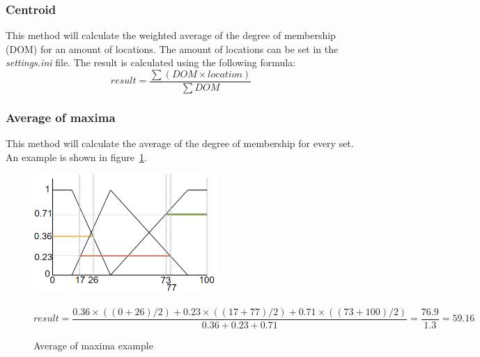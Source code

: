 \documentclass[10pt]{extarticle} %
\begin{document}
   \subsubsection {Centroid}  
   This method will calculate the weighted average of the degree of membership (DOM) for an amount of locations. The amount of locations can be set in the \emph{settings.ini} file.
   The result is calculated using the following formula:
   \[ result = \frac{\sum (DOM \times location)}{\sum DOM} \]
   
   \subsubsection {Average of maxima}  
   This method will calculate the average of the degree of membership for every set. An example is shown in figure~\ref{fig:maxAv}.
   \begin{figure}[h!]
   \begin{center}
   \includegraphics[width=7cm]{maxAv.png}
   \end{center}
   \[ result = \frac{0.36 \times ((0 + 26) / 2) + 0.23 \times ((17 + 77) / 2) + 0.71 \times ((73 + 100) / 2)}{0.36 + 0.23 + 0.71} = \frac{76.9}{1.3} = {59.16}\]
   \caption{Average of maxima example}
   \label{fig:maxAv}
   \end{figure}

 
    \newpage
\end{document}

